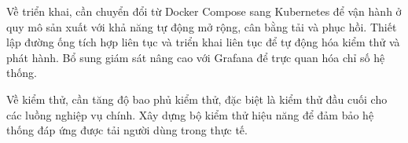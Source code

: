 Về triển khai, cần chuyển đổi từ Docker Compose sang Kubernetes để vận hành ở quy mô sản xuất với khả năng tự động mở rộng, cân bằng tải và phục hồi. Thiết lập đường ống tích hợp liên tục và triển khai liên tục để tự động hóa kiểm thử và phát hành. Bổ sung giám sát nâng cao với Grafana để trực quan hóa chỉ số hệ thống.

Về kiểm thử, cần tăng độ bao phủ kiểm thử, đặc biệt là kiểm thử đầu cuối cho các luồng nghiệp vụ chính. Xây dựng bộ kiểm thử hiệu năng để đảm bảo hệ thống đáp ứng được tải người dùng trong thực tế.

\newpage
